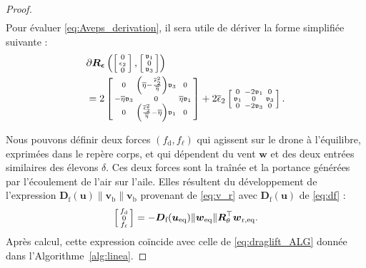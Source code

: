 \begin{proof}
\begin{align}
\end{align}
Pour évaluer \eqref{eq:Aveps_derivation}, il sera utile de dériver la forme simplifiée suivante : 
\begin{align}
\label{eq:diffRsparse}
    &\partial \boldsymbol{R}_{\boldsymbol{ \epsilon}} \left(
    \left[ \begin{smallmatrix}0 \\ \epsilon_2 \\ 0 \end{smallmatrix} \right]
    ,\left[ \begin{smallmatrix}\mathfrak{v}_1 \\ 0 \\ \mathfrak{v}_3 \end{smallmatrix} \right]\right) \nonumber \\ 
    & = 2  \left[ \begin{smallmatrix}0 & \left( \overline{\eta} - \frac{\overline \epsilon_{2}^{2}}{\overline{\eta}} \right) \mathfrak{v}_3 & 0\\
    -\overline{\eta} \mathfrak{v}_3 & 0 & \overline{\eta} \mathfrak{v}_1 \\
    0 & \left( \frac{\overline \epsilon_{2}^{2}}{\overline{\eta}} - \overline{\eta} \right) \mathfrak{v}_1 & 0 \end{smallmatrix} \right] + 2\overline \epsilon_{2}\left[ \begin{smallmatrix} 0 & -2\mathfrak{v}_1 & 0\\
    \mathfrak{v}_1 & 0 & \mathfrak{v}_3 \\
    0 & -2\mathfrak{v}_3 & 0 \end{smallmatrix} \right].
\end{align}

Nous pouvons définir deux forces $(f_{\text{d}} , f_{\ell})$ qui agissent sur le drone à l'équilibre, exprimées dans le repère corps, et qui dépendent du vent $\boldsymbol{w}$ et des deux entrées similaires des élevons $\delta$. Ces deux forces sont la traînée et la portance générées par l'écoulement de l'air sur l'aile. Elles résultent du développement de l'expression $ \boldsymbol{D}_{\text{f}}(\boldsymbol{u}) \lVert \boldsymbol{v}_{\text{b}} \rVert \boldsymbol{v}_{\text{b}}$ provenant de \eqref{eq:v_r} avec $\boldsymbol{D}_{\text{f}}(\boldsymbol{u})$ de \eqref{eq:df} :
\begin{align}
\label{eq:draglift}
    \left[ \begin{smallmatrix}f_{\text{d}} \\ 0 \\ f_{\ell} \end{smallmatrix} \right] = - \boldsymbol{D}_{\text{f}}(\boldsymbol{u_{\text{eq}}}) \lVert \boldsymbol{w}_{\mathrm{eq}} \rVert  \boldsymbol{R}_\theta^\top \boldsymbol{w}_{\mathrm{r,eq}}.
\end{align}
Après calcul, cette expression coïncide avec celle de \eqref{eq:draglift_ALG} donnée dans l'Algorithme~\ref{alg:linea}. 


\end{proof}
